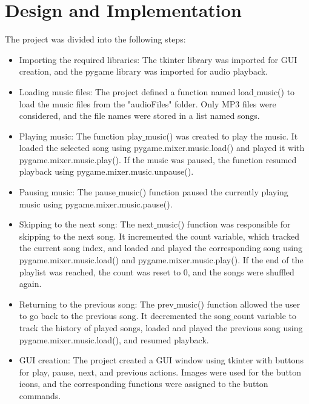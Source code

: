 \documentclass[journal,12pt,twocolumn]{IEEEtran}
\begin{document}
\section{Design and Implementation}
The project was divided into the following steps:
\begin{itemize}
\item Importing the required libraries: The tkinter library was imported for GUI creation, and the pygame library was imported for audio playback.

\item Loading music files: The project defined a function named load$\_$music() to load the music files from the "audioFiles" folder. Only MP3 files were considered, and the file names were stored in a list named songs.

\item Playing music: The function play$\_$music() was created to play the music. It loaded the selected song using pygame.mixer.music.load() and played it with pygame.mixer.music.play(). If the music was paused, the function resumed playback using pygame.mixer.music.unpause().

\item Pausing music: The pause$\_$music() function paused the currently playing music using pygame.mixer.music.pause().

\item Skipping to the next song: The next$\_$music() function was responsible for skipping to the next song. It incremented the count variable, which tracked the current song index, and loaded and played the corresponding song using pygame.mixer.music.load() and pygame.mixer.music.play(). If the end of the playlist was reached, the count was reset to 0, and the songs were shuffled again.

\item Returning to the previous song: The prev$\_$music() function allowed the user to go back to the previous song. It decremented the song$\_$count variable to track the history of played songs, loaded and played the previous song using pygame.mixer.music.load(), and resumed playback.

\item GUI creation: The project created a GUI window using tkinter with buttons for play, pause, next, and previous actions. Images were used for the button icons, and the corresponding functions were assigned to the button commands.
\end{itemize}
\end{document}
